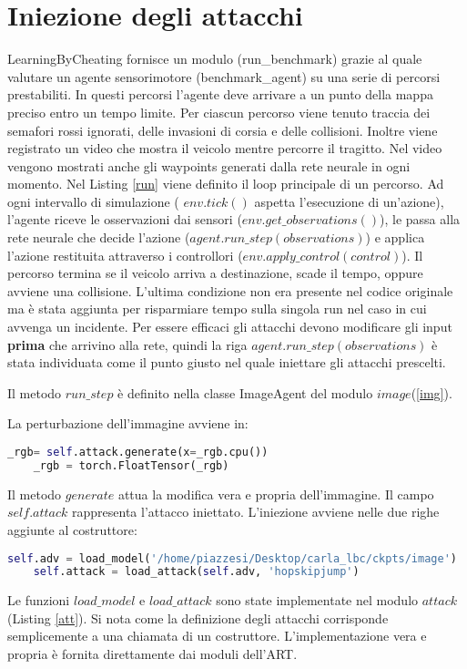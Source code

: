 \section{Iniezione degli attacchi}
LearningByCheating fornisce un modulo (run\_benchmark) grazie al quale valutare un agente sensorimotore (benchmark\_agent) su una serie di percorsi prestabiliti.
In questi percorsi l'agente deve arrivare a un punto della mappa preciso entro un tempo limite. Per ciascun percorso viene tenuto traccia dei semafori rossi ignorati, delle invasioni di corsia e delle collisioni. Inoltre viene registrato un video che mostra il veicolo mentre percorre il tragitto.
Nel video vengono mostrati anche gli waypoints generati dalla rete neurale in ogni momento. Nel Listing \ref{run} viene definito il loop principale di un percorso.
Ad ogni intervallo di simulazione ( $env.tick()$ aspetta l'esecuzione di un'azione),  l'agente riceve le osservazioni dai sensori ($env.get\_observations()$), le passa alla 
rete neurale che decide l'azione ($agent.run\_step(observations)$) e applica l'azione restituita attraverso i controllori ($env.apply\_control(control)$). Il percorso termina 
se il veicolo arriva a destinazione, scade il tempo, oppure avviene una collisione. L'ultima condizione non era presente nel codice originale ma è stata aggiunta per risparmiare tempo sulla singola run nel caso in cui avvenga un incidente. Per essere efficaci gli attacchi devono modificare gli input 
\textbf{prima} che arrivino alla rete, quindi la riga $agent.run\_step(observations)$ è stata individuata come il punto giusto nel quale iniettare gli attacchi prescelti.

Il metodo $run\_step$ è definito nella classe ImageAgent del  modulo $image$(\ref{img}).

La perturbazione dell'immagine avviene in:
\begin{lstlisting}[language=Python]
    _rgb= self.attack.generate(x=_rgb.cpu())
    _rgb = torch.FloatTensor(_rgb)
\end{lstlisting}
Il metodo $generate$ attua la modifica vera e propria dell'immagine. Il campo $self.attack$ rappresenta l'attacco iniettato. L'iniezione avviene nelle due righe aggiunte al costruttore:
\begin{lstlisting}[language=Python]
    self.adv = load_model('/home/piazzesi/Desktop/carla_lbc/ckpts/image')
    self.attack = load_attack(self.adv, 'hopskipjump')
\end{lstlisting}
Le funzioni $load\_model$ e $load\_attack$ sono state implementate nel modulo $attack$ (Listing \ref{att}). Si nota come la definizione  degli attacchi corrisponde semplicemente a una chiamata
di un costruttore. L'implementazione vera e propria  è fornita direttamente dai moduli dell'ART.


